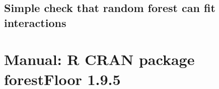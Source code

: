 \subsection{Simple check that random forest can fit interactions}





\section{Manual: R CRAN package forestFloor 1.9.5}



